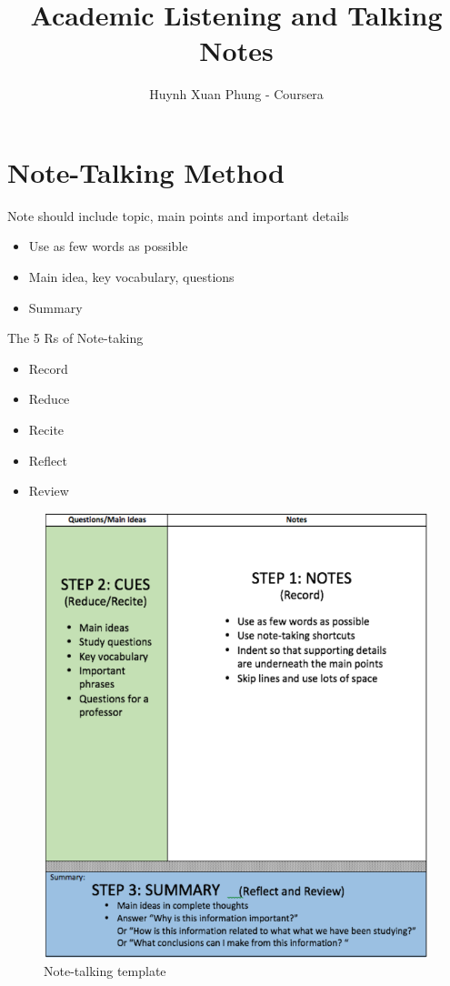 \documentclass{article}
\title{Academic Listening and Talking Notes}
\author{Huynh Xuan Phung - Coursera}
\date{ }
\begin{document}
 
\maketitle
 
\tableofcontents

\section{Note-Talking Method}

Note  should include topic, main points and important details

\begin{itemize}
\item{Use as few words as possible}
\item{Main idea, key vocabulary, questions}
\item{Summary}
\end{itemize}

The 5 Rs of Note-taking
\begin{itemize}
\item{Record}
\item{Reduce}
\item{Recite}
\item{Reflect}
\item{Review}
\end{itemize}


\begin{figure}
\includegraphics[scale =0.6]{figures/Note_template.png}
\caption{Note-talking template}
\end{figure}

\pagebreak
 
\end{document}
